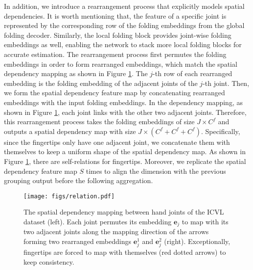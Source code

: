 \documentclass[10pt,twocolumn,letterpaper]{article}
\begin{document}
In addition, we introduce a rearrangement process that explicitly models spatial dependencies. It is worth mentioning that, the feature of a specific joint is represented by the corresponding row of the folding embeddings from the global folding decoder. Similarly, the local folding block provides joint-wise folding embeddings as well, enabling the network to stack more local folding blocks for accurate estimation. 
The rearrangement process first permutes the folding embeddings in order to form rearranged embeddings, which match the spatial dependency mapping as shown in Figure \ref{fig:relation}. The $j$-th row of each rearranged embedding is the folding embedding of the adjacent joints of the $j$-th joint. Then, we form the spatial dependency feature map by concatenating rearranged embeddings with the input folding embeddings. In the dependency mapping, as shown in Figure \ref{fig:relation}, each joint links with the other two adjacent joints. Therefore, this rearrangement process takes the folding embeddings of size $J \times C^f$ and outputs a spatial dependency map with size $J \times (C^f + C^f + C^f)$. Specifically, since the fingertips only have one adjacent joint, we concatenate them with themselves to keep a uniform shape of the spatial dependency map. As shown in Figure \ref{fig:relation}, there are self-relations for fingertips. 
Moreover, we replicate the spatial dependency feature map $S$ times to align the dimension with the previous grouping output before the following aggregation. 


\begin{figure}
\centering
\texttt{[image: figs/relation.pdf]}
\caption{The spatial dependency mapping between hand joints of the ICVL dataset (left). Each joint permutes its embedding $\textbf{e}_j$ to map with its two adjacent joints along the mapping direction of the arrows forming two rearranged embeddings $\textbf{e}^1_j$ and $\textbf{e}^2_j$ (right). Exceptionally, fingertips
are forced to map with themselves (red dotted arrows) to keep consistency.}
\label{fig:relation}
\end{figure}
\end{document}
